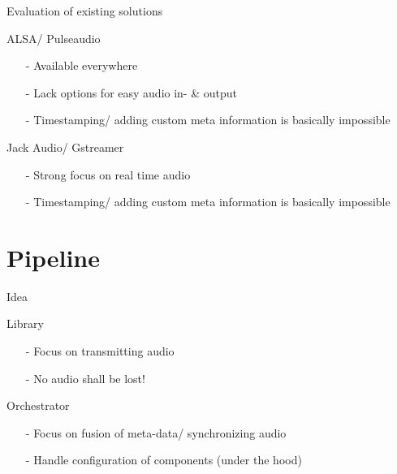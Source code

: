 \documentclass{beamer}
\begin{document}
	
	\begin{frame}{Evaluation of existing solutions}
		\begin{alertblock}{ALSA/ Pulseaudio}
			\begin{itemize}
				\item[-] Available everywhere
				\item[-] Lack options for easy audio in- \& output
				\item[-] Timestamping/ adding custom meta information is basically impossible
			\end{itemize}
		\end{alertblock}
		\pause
		\begin{alertblock}{Jack Audio/ Gstreamer}
			\begin{itemize}
				\item[-] Strong focus on real time audio
				\item[-] Timestamping/ adding custom meta information is basically impossible
			\end{itemize}
		\end{alertblock}
	\end{frame}
	
	
	
	
	
	

	\section{Pipeline}
	
	\begin{frame}{Idea}
		\begin{alertblock}{Library}
			\begin{itemize}
				\item[-] Focus on transmitting audio
				\item[-] No audio shall be lost!
			\end{itemize}
		\end{alertblock}
		\pause
		\begin{alertblock}{Orchestrator}
			\begin{itemize}
				\item[-] Focus on fusion of meta-data/ synchronizing audio
				\item[-] Handle configuration of components (under the hood)
			\end{itemize}
		\end{alertblock}	
	\end{frame}
	
\end{document}

